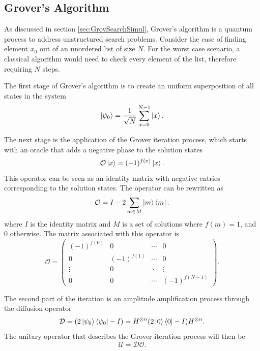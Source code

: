 \documentclass[../../dissertation.tex]{subfiles}
\begin{document}
\subsection{Grover's Algorithm}
As discussed in section \ref{sec:GrovSearchSimul}, Grover's algorithm
is a quantum process to address unstructured search problems. Consider the case of
finding element $x_0$ out of an unordered list of size $N$. For the worst case
scenario, a classical algorithm would need to check every element of the list, therefore requiring $N$ steps.\par

The first stage of Grover's algorithm is to create an uniform superposition of
all states in the system
\begin{equation}
	\ket{\psi_0}  = \frac{1}{\sqrt{N}}\sum_{x=0}^{N-1} \ket{x}.
\end{equation}\par

The next stage is the application of the Grover iteration process, which starts
with an oracle that adds a negative phase to the solution states
\begin{equation}
        \mathcal{O}\ket{x} = (-1)^{f(x)}\ket{x}.
\end{equation}
This operator can be seen as an identity matrix with negative entries
corresponding to the solution states. The operator can be rewritten as 
\begin{equation}
	\mathcal{O} = I - 2\sum_{m\in M} \ket{m}\bra{m}.
	\label{eq:groverQiskitOracle}
\end{equation}
where $I$ is the identity matrix and $M$ is a set of solutions where $f(m) =
1$, and $0$ otherwise. The matrix associated with this operator is
\begin{equation}
	\mathcal{O} = 
	\begin{pmatrix}
		(-1)^{f(0)} & 0 & \cdots & 0\\
	        0 & (-1)^{f(1)} & \cdots & 0\\ 
	        \vdots & 0 &  \ddots & \vdots\\ 
		0 & 0 & \cdots &  (-1)^{f(N-1)}
	\end{pmatrix}.
	\label{eq:oracleMatrixQiskit}
\end{equation}\par

The second part of the iteration is an amplitude amplification process through the diffusion operator 
\begin{equation}
        \mathcal{D} = (2\ket{\psi_0}\bra{\psi_0} - I) = H^{\otimes n}(2\ket{0}\bra{0} - I)H^{\otimes n}.
	\label{eq:groverQiskitDiffusion}
\end{equation}
The unitary operator that describes the Grover iteration process will then be
\begin{equation}
        \mathcal{U} = \mathcal{D}\mathcal{O}.
\end{equation}\par
\end{document}

